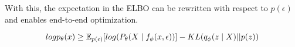 With this, the expectation in the \ac{ELBO} can be rewritten with respect to $p(\epsilon)$ and enables end-to-end optimization. 

\begin{equation}
log p_{\theta}(x) \geq \operatorname{\mathbb{E}}_{p(\epsilon) } [ log(P_{\theta}(X \; | \;{f_{\phi}(x, \epsilon)}) ]  - KL(q_{\phi}(z \; | \;{X}) || p(z))
\end{equation}










